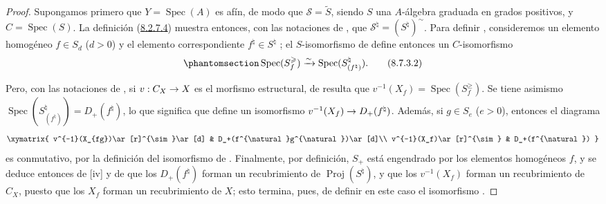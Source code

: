 \documentclass[oneside,10pt]{amsart}
\makeatletter
\newcommand{\ega@arrow}[2]{\mathchoice{#1}{#2}{#2}{#2}}
\renewcommand{\to}{\ega@arrow{\longrightarrow}{\rightarrow}}
\newcommand{\oldpage}[2][]{\marginnote{\normalfont\footnotesize\textbf{#1}~|~#2}\ignorespaces}
\let\EGAOriginalLabel\label
\renewcommand{\label}[1]{\phantomsection\EGAOriginalLabel{#1}}
\makeatother
\begin{document}
\begin{proof}
Supongamos primero que $Y=\operatorname{Spec}(A)$ es afín, de modo que $\mathcal{S}=\widetilde{S}$, siendo $S$ una $A$-álgebra graduada en grados positivos, y $C=\operatorname{Spec}(S)$.
La definición (\hyperref[II.8.2.6.2-fr]{8.2.7.4}) muestra entonces, con las notaciones de , que $\mathcal{S}^{\natural}=(S^{\natural})^{\sim}$.
Para definir , consideremos un elemento homogéneo $f\in S_d$ ($d>0$) y el elemento correspondiente $f^{\natural}\in S^{\natural}$ ;
el $S$-isomorfismo de  define entonces un $C$-isomorfismo
\begin{equation}
\label{II.8.7.3.2-fr}
  \operatorname{Spec}(S_f^{\geqslant})
  \xrightarrow{\sim}
  \operatorname{Spec}(S_{(f^{\natural})}^{\natural}).
\tag{8.7.3.2}
\end{equation}

\oldpage[II]{175}
Pero, con las notaciones de , si $v:C_X\to X$ es el morfismo estructural, de  resulta que $v^{-1}(X_f)=\operatorname{Spec}(S_f^{\geqslant})$.
Se tiene asimismo $\operatorname{Spec}(S_{(f^{\natural})}^{\natural})=D_+(f^{\natural})$, lo que significa que  define un isomorfismo $v^{-1}(X_f)\to D_+(f^{\natural})$.
Además, si $g\in S_e$ ($e>0$), entonces el diagrama
\[
  \xymatrix{
    v^{-1}(X_{fg})\ar[r]^{\sim}\ar[d] &
    D_+(f^{\natural}g^{\natural})\ar[d]\\
    v^{-1}(X_f)\ar[r]^{\sim} & D_+(f^{\natural})
  }
\]
es conmutativo, por la definición del isomorfismo de .
Finalmente, por definición, $S_+$ está engendrado por los elementos homogéneos $f$, y se deduce entonces de [iv] y de  que los $D_+(f^{\natural})$ forman un recubrimiento de $\operatorname{Proj}(S^{\natural})$, y que los $v^{-1}(X_f)$ forman un recubrimiento de $C_X$, puesto que los $X_f$ forman un recubrimiento de $X$;
esto termina, pues, de definir en este caso el isomorfismo .


\end{proof}
\end{document}
